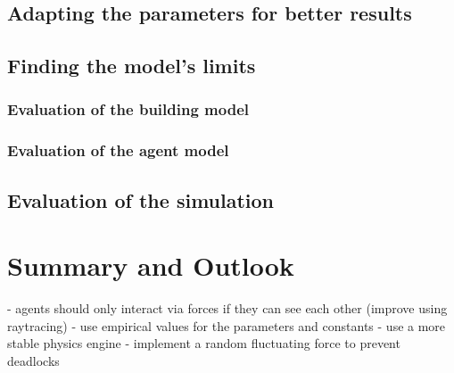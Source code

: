 \documentclass[11pt]{article}
\begin{document}
\subsection{Adapting the parameters for better results}

\subsection{Finding the model's limits}


\subsubsection{Evaluation of the building model}
\subsubsection{Evaluation of the agent model}

\subsection{Evaluation of the simulation}

\section{Summary and Outlook}
- agents should only interact via forces if they can see each other (improve using raytracing)
- use empirical values for the parameters and constants
- use a more stable physics engine
- implement a random fluctuating force to prevent deadlocks





\end{document}
